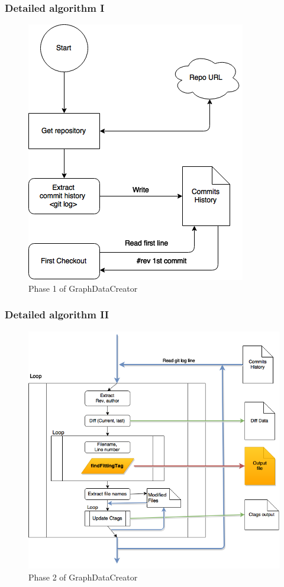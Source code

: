 \documentclass{beamer}
\begin{document}
\begin{frame}
\frametitle{Detailed algorithm I}
\begin{figure}
\includegraphics[scale=0.4]{GDCphase1.png} 
\caption{Phase 1 of GraphDataCreator}
\label{fig:phase1}
\end{figure}
\end{frame}


\begin{frame}
\frametitle{Detailed algorithm II}
\begin{figure}
\includegraphics[scale=0.3]{GDCphase2.png} 
\caption{Phase 2 of GraphDataCreator}
\label{fig:phase2}
\end{figure}
\end{frame}
\end{document}
